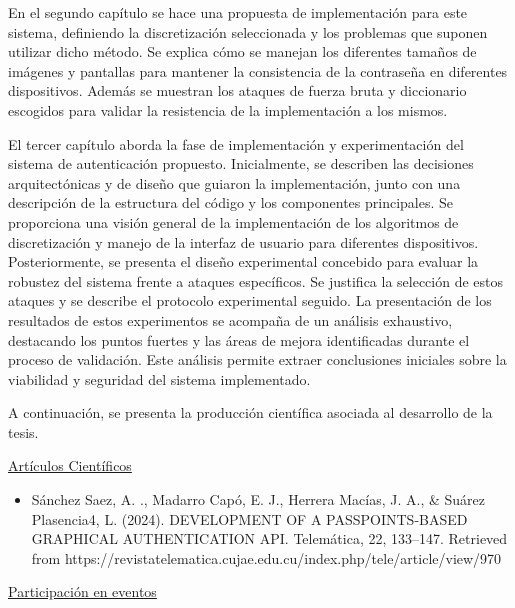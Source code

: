 En el segundo capítulo se hace una propuesta de implementación para este sistema, definiendo la discretización seleccionada y los problemas que suponen utilizar dicho método. Se explica cómo se manejan los diferentes tamaños de imágenes y pantallas para mantener la consistencia de la contraseña en diferentes dispositivos. Además se muestran los ataques de fuerza bruta y diccionario escogidos para validar la resistencia de la implementación a los mismos.

El tercer capítulo aborda la fase de implementación y experimentación del sistema de autenticación propuesto. Inicialmente, se describen las decisiones arquitectónicas y de diseño que guiaron la implementación, junto con una descripción de la estructura del código y los componentes principales. Se proporciona una visión general de la implementación de los algoritmos de discretización y manejo de la interfaz de usuario para diferentes dispositivos. Posteriormente, se presenta el diseño experimental concebido para evaluar la robustez del sistema frente a ataques específicos. Se justifica la selección de estos ataques y se describe el protocolo experimental seguido. La presentación de los resultados de estos experimentos se acompaña de un análisis exhaustivo, destacando los puntos fuertes y las áreas de mejora identificadas durante el proceso de validación. Este análisis permite extraer conclusiones iniciales sobre la viabilidad y seguridad del sistema implementado.

A continuaci\'on, se presenta la producci\'on cient\'ifica asociada al desarrollo de la tesis.

\underline{Art\'iculos Cient\'ificos}
\begin{itemize}
	\item Sánchez Saez, A. ., Madarro Capó, E. J., Herrera Macías, J. A., \& Suárez Plasencia4, L. (2024). DEVELOPMENT OF A PASSPOINTS-BASED GRAPHICAL AUTHENTICATION API. Telemática, 22, 133–147. Retrieved from https://revistatelematica.cujae.edu.cu/index.php/tele/article/view/970
\end{itemize}


\underline{Participaci\'on en eventos}

